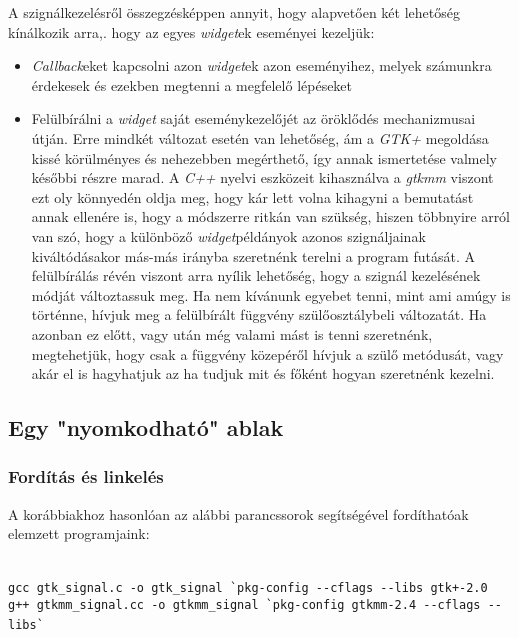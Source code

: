 A szignálkezelésről összegzésképpen annyit, hogy alapvetően két lehetőség kínálkozik arra,. hogy az egyes \textit{widget}ek eseményei kezeljük:

\begin{itemize}
 \item \textit{Callback}eket kapcsolni azon \textit{widget}ek azon eseményihez, melyek számunkra érdekesek és ezekben megtenni a megfelelő lépéseket

 \item Felülbírálni a \textit{widget} saját eseménykezelőjét az öröklődés mechanizmusai útján. Erre mindkét változat esetén van lehetőség, ám a \textit{GTK+} megoldása kissé körülményes és nehezebben megérthető, így annak ismertetése valmely későbbi részre marad. A \textit{C++} nyelvi eszközeit kihasználva a \textit{gtkmm} viszont ezt oly könnyedén oldja meg, hogy kár lett volna kihagyni a bemutatást annak ellenére is, hogy a módszerre ritkán van szükség, hiszen többnyire arról van szó, hogy a különböző \textit{widget}példányok azonos szignáljainak kiváltódásakor más-más irányba szeretnénk terelni a program futását. A felülbírálás révén viszont arra nyílik lehetőség, hogy a szignál kezelésének módját változtassuk meg. Ha nem kívánunk egyebet tenni, mint ami amúgy is történne, hívjuk meg a felülbírált függvény szülőosztálybeli változatát. Ha azonban  ez előtt, vagy után még valami mást is tenni szeretnénk, megtehetjük, hogy csak a függvény közepéről hívjuk a szülő metódusát, vagy akár el is hagyhatjuk az ha tudjuk mit és főként hogyan szeretnénk kezelni.
\end{itemize}

\subsection{Egy "nyomkodható" ablak}

\subsubsection{Fordítás és linkelés}

A korábbiakhoz hasonlóan az alábbi parancssorok segítségével fordíthatóak e\-lem\-zett programjaink:

\fontsize{8pt}{8pt}
\ \\
\texttt{gcc gtk\_signal.c -o gtk\_signal \`{}pkg-config {-}-cflags {-}-libs gtk+-2.0}
\ \\
\texttt{g++ gtkmm\_signal.cc -o gtkmm\_signal \`{}pkg-config gtkmm-2.4 {-}-cflags {-}-libs\`{}}
\ \\

